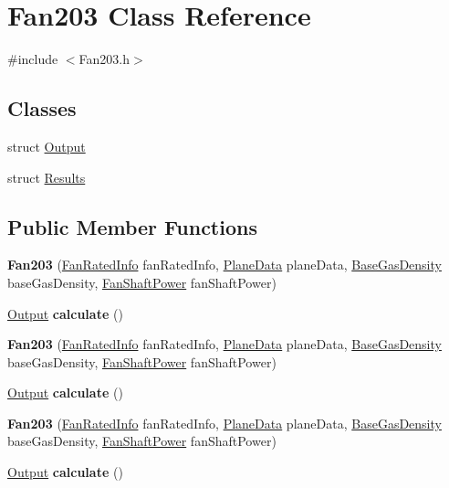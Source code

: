 \hypertarget{class_fan203}{}\section{Fan203 Class Reference}
\label{class_fan203}


{\ttfamily \#include $<$Fan203.\+h$>$}

\subsection*{Classes}
\begin{DoxyCompactItemize}
\item 
struct \hyperlink{struct_fan203_1_1_output}{Output}
\item 
struct \hyperlink{struct_fan203_1_1_results}{Results}
\end{DoxyCompactItemize}
\subsection*{Public Member Functions}
\begin{DoxyCompactItemize}
\item 
\mbox{\label{class_fan203_a1bfc0312472778af52324d9245a8b121}} 
{\bfseries Fan203} (\hyperlink{class_fan_rated_info}{Fan\+Rated\+Info} fan\+Rated\+Info, \hyperlink{class_plane_data}{Plane\+Data} plane\+Data, \hyperlink{class_base_gas_density}{Base\+Gas\+Density} base\+Gas\+Density, \hyperlink{class_fan_shaft_power}{Fan\+Shaft\+Power} fan\+Shaft\+Power)
\item 
\mbox{\label{class_fan203_a74256a8964735afeaf3800d52b92e551}} 
\hyperlink{struct_fan203_1_1_output}{Output} {\bfseries calculate} ()
\item 
\mbox{\label{class_fan203_a1bfc0312472778af52324d9245a8b121}} 
{\bfseries Fan203} (\hyperlink{class_fan_rated_info}{Fan\+Rated\+Info} fan\+Rated\+Info, \hyperlink{class_plane_data}{Plane\+Data} plane\+Data, \hyperlink{class_base_gas_density}{Base\+Gas\+Density} base\+Gas\+Density, \hyperlink{class_fan_shaft_power}{Fan\+Shaft\+Power} fan\+Shaft\+Power)
\item 
\mbox{\label{class_fan203_a74256a8964735afeaf3800d52b92e551}} 
\hyperlink{struct_fan203_1_1_output}{Output} {\bfseries calculate} ()
\item 
\mbox{\label{class_fan203_a1bfc0312472778af52324d9245a8b121}} 
{\bfseries Fan203} (\hyperlink{class_fan_rated_info}{Fan\+Rated\+Info} fan\+Rated\+Info, \hyperlink{class_plane_data}{Plane\+Data} plane\+Data, \hyperlink{class_base_gas_density}{Base\+Gas\+Density} base\+Gas\+Density, \hyperlink{class_fan_shaft_power}{Fan\+Shaft\+Power} fan\+Shaft\+Power)
\item 
\mbox{\label{class_fan203_a74256a8964735afeaf3800d52b92e551}} 
\hyperlink{struct_fan203_1_1_output}{Output} {\bfseries calculate} ()
\end{DoxyCompactItemize}


